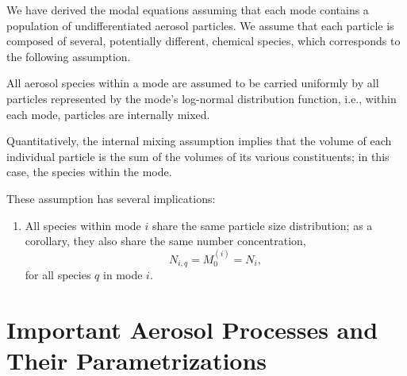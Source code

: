 We have derived the modal equations assuming that each mode contains a
population of undifferentiated aerosol particles. 
We assume that each particle is composed of several, potentially different, chemical species, which corresponds to the following assumption.
%
%
%
%
%
%

\begin{assume}
  All aerosol species within a mode are assumed to be carried uniformly by all particles represented by the mode's log-normal distribution function, i.e., within each mode, particles are internally mixed.
\end{assume}

\begin{assume}
  Quantitatively, the internal mixing assumption implies that the volume of each individual particle is the sum of the volumes of its various constituents; in this case, the species within the mode.  
\end{assume}

These assumption has several implications:
\begin{enumerate}
  \item All species within mode $i$ share the same particle size distribution; as a corollary, they also share the same number concentration,
  \begin{equation}
    N_{i,q} = M_0^{(i)} = N_i,
  \end{equation}
  for all species $q$ in mode $i$.
\end{enumerate}

\section{Important Aerosol Processes and Their Parametrizations}
